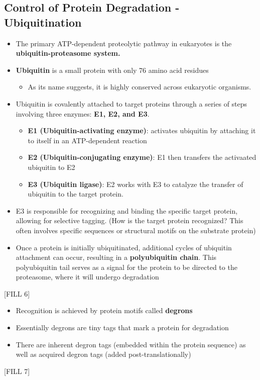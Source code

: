 \documentclass[10pt]{article}
\begin{document}
\subsection*{Control of Protein Degradation - Ubiquitination}
\begin{itemize}
    \item The primary ATP-dependent proteolytic pathway in eukaryotes is the \textbf{ubiquitin-proteasome system.}
    \item \textbf{Ubiquitin} is a small protein with only 76 amino acid residues
    \begin{itemize}
        \item As its name suggests, it is highly conserved across eukaryotic organisms.
    \end{itemize}
    \item Ubiquitin is covalently attached to target proteins through a series of steps involving three enzymes: \textbf{E1, E2, and E3}.
    \begin{itemize}
        \item \textbf{E1 (Ubiquitin-activating enzyme)}: activates ubiquitin by attaching it to itself in an ATP-dependent reaction
        \item \textbf{E2 (Ubiquitin-conjugating enzyme)}: E1 then transfers the activaated ubiquitin to E2
        \item \textbf{E3 (Ubiquitin ligase)}: E2 works with E3 to catalyze the transfer of ubiquitin to the target protein.
    \end{itemize}
    \item E3 is responsible for recognizing and binding the specific target protein, allowing for selective tagging.  (How is the target protein recognized?  This often involves specific sequences or structural motifs on the substrate protein)
    \item Once a protein is initially ubiquitinated, additional cycles of ubiquitin attachment can occur, resulting in a \textbf{polyubiquitin chain}.  This polyubiquitin tail serves as a signal for the protein to be directed to the proteasome, where it will undergo degradation
\end{itemize}
\begin{center}
    [FILL 6]
\end{center}
\begin{itemize}
    \item Recognition is achieved by protein motifs called \textbf{degrons}
    \item Essentially degrons are tiny tags that mark a protein for degradation
    \item There are inherent degron tags (embedded within the protein sequence) as well as acquired degron tags (added post-translationally)
\end{itemize}
\begin{center}
    [FILL 7]
\end{center}
\end{document}
